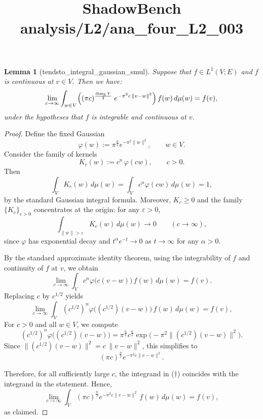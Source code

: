 \documentclass{article}
\title{ShadowBench analysis/L2/ana\_four\_L2\_003}
\newtheorem{lemma}{Lemma}
\begin{document}
\maketitle

\begin{lemma}[tendsto_integral_gaussian_smul] Suppose that  $f\in L^{1}(V;E)$ and $f$  is continuous at $v\in V$. Then we have:
    \[
\lim_{c\to\infty}
\int_{w\in V}
\Bigl((\pi c)^{\frac{\dim_{\mathbb R}V}{2}}\;
e^{-\pi^{2}c\,\|v-w\|^{2}}\Bigr)\, f(w)\,d\mu(w)
= f(v),
\]
under the hypotheses that $f$ is integrable and continuous at $v$.
\end{lemma}

\begin{proof}
Define the fixed Gaussian
\[
\varphi(w) := \pi^{\frac n2} e^{-\pi^2 \|w\|^2},
\qquad w \in V.
\]
Consider the family of kernels
\[
K_c(w) := c^n\, \varphi(c w), \qquad c > 0.
\]
Then
\[
\int_V K_c(w)\, d\mu(w)
=
\int_V c^n \varphi(c w)\, d\mu(w)
= 1,
\]
by the standard Gaussian integral formula. Moreover, $K_c \ge 0$ and the family $\{K_c\}_{c>0}$ concentrates at the origin:
for any $\varepsilon>0$,
\[
\int_{\|w\|>\varepsilon} K_c(w)\, d\mu(w) \longrightarrow 0
\qquad (c\to\infty),
\]
since $\varphi$ has exponential decay and $t^{\alpha} e^{-t} \to 0$ as $t \to \infty$ for any $\alpha>0$.

By the standard approximate identity theorem, using the integrability of $f$ and continuity of $f$ at $v$, we obtain
\[
\lim_{c \to \infty}
\int_V c^n \varphi\bigl(c(v-w)\bigr)\, f(w)\, d\mu(w)
= f(v).
\]
Replacing $c$ by $c^{1/2}$ yields
\begin{equation} \tag{$\dagger$}
\lim_{c \to \infty}
\int_V (c^{1/2})^n \varphi\bigl((c^{1/2})(v-w)\bigr)\, f(w)\, d\mu(w)
= f(v),
\end{equation}
For $c>0$ and all $w\in V$, we compute
\[
(c^{1/2})^n \varphi\bigl((c^{1/2})(v-w)\bigr)
=
\pi^{\frac n2} c^{\frac n2}
\exp\!\bigl(-\pi^2 \|(c^{1/2})(v-w)\|^2\bigr).
\]
Since $\|(c^{1/2})(v-w)\|^2 = c\,\|v-w\|^2$, this simplifies to
\[
(\pi c)^{\frac n2} e^{-\pi^2 c \|v-w\|^2}.
\]


Therefore, for all sufficiently large $c$, the integrand in ($\dagger$) coincides with the integrand in the statement. Hence,
\[
\lim_{c \to \infty}
\int_V
(\pi c)^{\frac n2} e^{-\pi^2 c \|v-w\|^2}\, f(w)\, d\mu(w)
= f(v),
\]
as claimed.
\end{proof}
\end{document}
